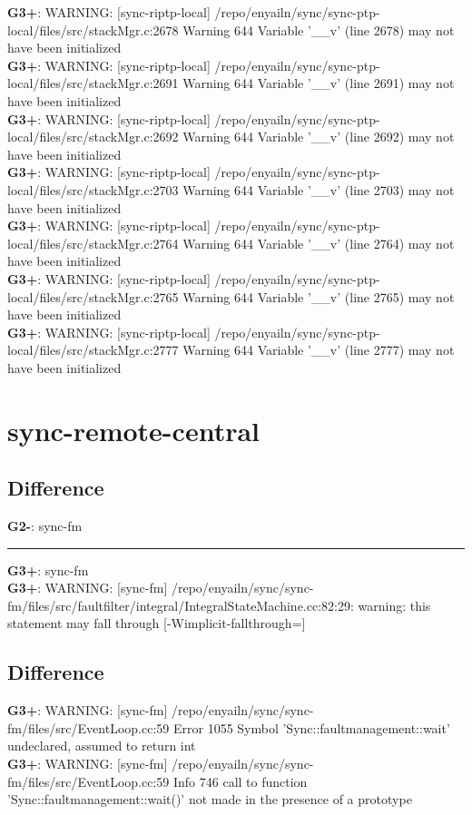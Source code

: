 \documentclass[12pt,twoside]{article}
\begin{document}
\textbf{G3+}: WARNING: [sync-riptp-local] /repo/enyailn/sync/sync-ptp-local/files/src/stackMgr.c:2678 Warning 644 Variable '\_\_v' (line 2678) may not have been initialized\\ 
\textbf{G3+}: WARNING: [sync-riptp-local] /repo/enyailn/sync/sync-ptp-local/files/src/stackMgr.c:2691 Warning 644 Variable '\_\_v' (line 2691) may not have been initialized\\ 
\textbf{G3+}: WARNING: [sync-riptp-local] /repo/enyailn/sync/sync-ptp-local/files/src/stackMgr.c:2692 Warning 644 Variable '\_\_v' (line 2692) may not have been initialized\\ 
\textbf{G3+}: WARNING: [sync-riptp-local] /repo/enyailn/sync/sync-ptp-local/files/src/stackMgr.c:2703 Warning 644 Variable '\_\_v' (line 2703) may not have been initialized\\ 
\textbf{G3+}: WARNING: [sync-riptp-local] /repo/enyailn/sync/sync-ptp-local/files/src/stackMgr.c:2764 Warning 644 Variable '\_\_v' (line 2764) may not have been initialized\\ 
\textbf{G3+}: WARNING: [sync-riptp-local] /repo/enyailn/sync/sync-ptp-local/files/src/stackMgr.c:2765 Warning 644 Variable '\_\_v' (line 2765) may not have been initialized\\ 
\textbf{G3+}: WARNING: [sync-riptp-local] /repo/enyailn/sync/sync-ptp-local/files/src/stackMgr.c:2777 Warning 644 Variable '\_\_v' (line 2777) may not have been initialized\\ 
  
\section{sync-remote-central} 
\subsection{Difference} 
\textbf{G2-}: sync-fm 
\rule{\textwidth}{0.5pt} 
\textbf{G3+}: sync-fm\\ 
\textbf{G3+}: WARNING: [sync-fm] /repo/enyailn/sync/sync-fm/files/src/faultfilter/integral/IntegralStateMachine.cc:82:29: warning: this statement may fall through [-Wimplicit-fallthrough=]\\ 
\subsection{Difference} 
\textbf{G3+}: WARNING: [sync-fm] /repo/enyailn/sync/sync-fm/files/src/EventLoop.cc:59 Error 1055 Symbol 'Sync::faultmanagement::wait' undeclared, assumed to return int\\ 
\textbf{G3+}: WARNING: [sync-fm] /repo/enyailn/sync/sync-fm/files/src/EventLoop.cc:59 Info 746 call to function 'Sync::faultmanagement::wait()' not made in the presence of a prototype\\ 
\end{document}
